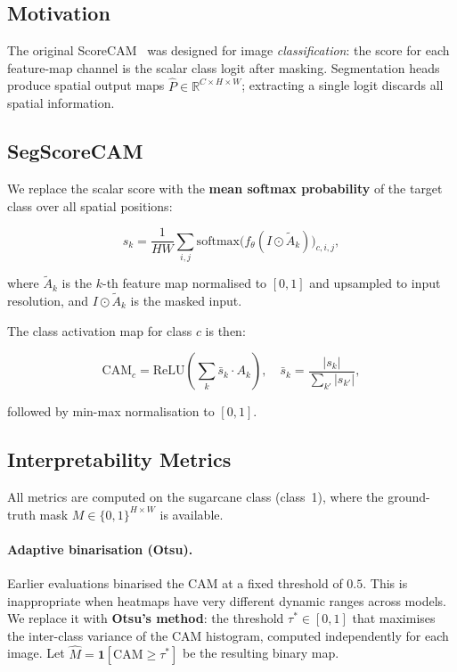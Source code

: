 \documentclass[12pt,a4paper]{article}
\newcommand{\R}{\mathbb{R}}
\theoremstyle{definition}
\begin{document}
\subsection{Motivation}

The original ScoreCAM~\cite{scorecam2020} was designed for image
\emph{classification}: the score for each feature-map channel is the scalar
class logit after masking.  Segmentation heads produce spatial output maps
$\hat{P} \in \R^{C \times H \times W}$; extracting a single logit discards
all spatial information.

\subsection{SegScoreCAM}

We replace the scalar score with the \textbf{mean softmax probability} of the
target class over all spatial positions:

\[
  s_k = \frac{1}{H W}
        \sum_{i,j} \mathrm{softmax}\bigl(f_\theta(I \odot \tilde{A}_k)\bigr)_{c,i,j},
\]

where $\tilde{A}_k$ is the $k$-th feature map normalised to $[0,1]$ and
upsampled to input resolution, and $I \odot \tilde{A}_k$ is the masked input.

The class activation map for class $c$ is then:

\[
  \mathrm{CAM}_c = \mathrm{ReLU}\!\left(
    \sum_k \bar{s}_k \cdot A_k
  \right), \quad
  \bar{s}_k = \frac{|s_k|}{\sum_{k'} |s_{k'}|},
\]

followed by min-max normalisation to $[0,1]$.

\subsection{Interpretability Metrics}
\label{sec:cam_metrics}

All metrics are computed on the sugarcane class (class~1), where the
ground-truth mask $M \in \{0,1\}^{H \times W}$ is available.

\paragraph{Adaptive binarisation (Otsu).}
Earlier evaluations binarised the CAM at a fixed threshold of $0.5$.  This
is inappropriate when heatmaps have very different dynamic ranges across
models.  We replace it with \textbf{Otsu's method}: the threshold
$\tau^* \in [0,1]$ that maximises the inter-class variance of the CAM
histogram, computed independently for each image.  Let
$\hat{M} = \mathbf{1}[\mathrm{CAM} \geq \tau^*]$ be the resulting binary map.
\end{document}
